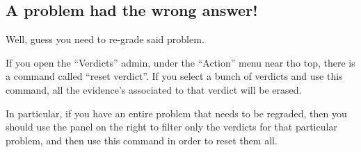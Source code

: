 \subsection{A problem had the wrong answer!}
Well, guess you need to re-grade said problem.

If you open the ``Verdicts'' admin,
under the ``Action'' menu near tho top,
there is a command called ``reset verdict''.
If you select a bunch of verdicts and use this command,
all the evidence's associated to that verdict will be erased.

In particular, if you have an entire problem that needs to be regraded,
then you should use the panel on the right to filter
only the verdicts for that particular problem,
and then use this command in order to reset them all.
